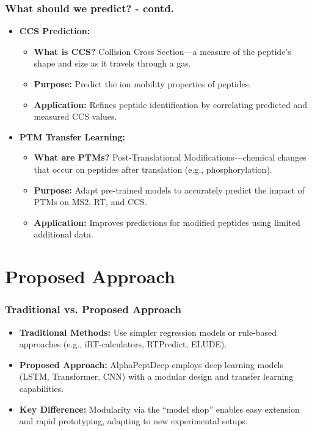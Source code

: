 \documentclass{beamer}
\begin{document}
\begin{frame}
  \frametitle{What should we predict? - contd.}
  \begin{itemize}
    \item \textbf{CCS Prediction:}
      \begin{itemize}
        \item \textbf{What is CCS?} Collision Cross Section—a measure of the peptide's shape and size as it travels through a gas.
        \item \textbf{Purpose:} Predict the ion mobility properties of peptides.
        \item \textbf{Application:} Refines peptide identification by correlating predicted and measured CCS values.
      \end{itemize}
    \item \textbf{PTM Transfer Learning:}
      \begin{itemize}
        \item \textbf{What are PTMs?} Post-Translational Modifications—chemical changes that occur on peptides after translation (e.g., phosphorylation).
        \item \textbf{Purpose:} Adapt pre-trained models to accurately predict the impact of PTMs on MS2, RT, and CCS.
        \item \textbf{Application:} Improves predictions for modified peptides using limited additional data.
      \end{itemize}
  \end{itemize}
\end{frame}

\section{Proposed Approach}
\begin{frame}
  \frametitle{Traditional vs. Proposed Approach}
  \begin{itemize}
    \item \textbf{Traditional Methods:} Use simpler regression models or rule-based approaches (e.g., iRT-calculators, RTPredict, ELUDE).
    \item \textbf{Proposed Approach:} AlphaPeptDeep employs deep learning models (LSTM, Transformer, CNN) with a modular design and transfer learning capabilities.
    \item \textbf{Key Difference:} Modularity via the “model shop” enables easy extension and rapid prototyping, adapting to new experimental setups.
  \end{itemize}
\end{frame}
\end{document}
